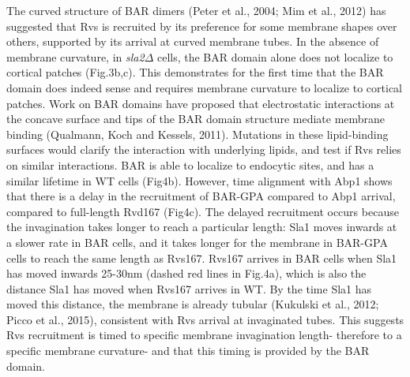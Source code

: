 \documentclass[9pt,lineno]{elife}
\begin{document}
The curved structure of BAR dimers (Peter et al., 2004; Mim et al., 2012) has suggested that Rvs is recruited by its preference for some membrane shapes over others, supported by its arrival at curved membrane tubes. In the absence of membrane curvature, in  \textit{sla2$\Delta$}  cells, the BAR domain alone does not localize to cortical patches (Fig.3b,c). This demonstrates for the first time that the BAR domain does indeed sense and requires membrane curvature to localize to cortical patches. Work on BAR domains have proposed that electrostatic interactions at the concave surface and tips of the BAR domain structure mediate membrane binding (Qualmann, Koch and Kessels, 2011). Mutations in these lipid-binding surfaces would clarify the interaction with underlying lipids, and test if Rvs relies on similar interactions.
BAR is able to localize to endocytic sites, and has a similar lifetime in WT cells (Fig4b). However, time alignment with Abp1 shows that there is a delay in the recruitment of BAR-GPA compared to Abp1 arrival, compared to full-length Rvd167 (Fig4c). The delayed recruitment occurs because the invagination takes longer to reach a particular length: Sla1 moves inwards at a slower rate in BAR cells, and it takes longer for the membrane in BAR-GPA cells to reach the same length as Rvs167. Rvs167 arrives in BAR cells when Sla1 has moved inwards 25-30nm (dashed red lines in Fig.4a), which is also the distance Sla1 has moved when Rvs167 arrives in WT. By the time Sla1 has moved this distance, the membrane is already tubular (Kukulski et al., 2012; Picco et al., 2015), consistent with Rvs arrival at invaginated tubes. This suggests Rvs recruitment is timed to specific membrane invagination length- therefore to a specific membrane curvature- and that this timing is provided by the BAR domain.

\end{document}
